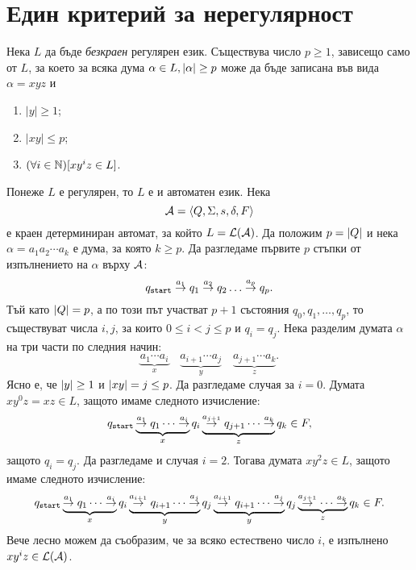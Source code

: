 \section{Един критерий за нерегулярност}

\begin{lemma}
  \label{lem:regular:pumping}
  Нека $L$ да бъде {\em безкраен} регулярен език.
  Съществува число $p\geq 1$, зависещо само от $L$, 
  за което за всяка дума $\alpha\in L, \lvert{\alpha}\rvert\geq p$ може да 
  бъде записана във вида $\alpha = xyz$ и 
  \begin{enumerate}[1)]
  \item
    $|y|\geq 1$;
  \item
    $|xy|\leq p$;
  \item
    $(\forall i\in\mathbb{N})[xy^iz \in L]$.
  \end{enumerate}
\end{lemma}
\begin{hint}
  Понеже $L$ е регулярен, то $L$ е и автоматен език. Нека
  \[\mathcal{A} = \langle{Q,\Sigma,s,\delta,F}\rangle\]
  е краен детерминиран автомат, за който $L = \mathcal{L}(\mathcal{A})$.
  Да положим $p = \lvert{Q}\rvert$ и нека $\alpha = a_1a_2\cdots a_k$ е дума, за която $k \geq p$.
  Да разгледаме първите $p$ стъпки от изпълнението на $\alpha$ върху $\mathcal{A}$:
  \[q_{\texttt{start}}\stackrel{a_1}{\rightarrow} q_1 \stackrel{a_2}{\rightarrow}q_2 \dots \stackrel{a_p}{\rightarrow} q_p.\]
  Тъй като $\lvert{Q}\rvert = p$, а по този път участват $p+1$ състояния $q_0,q_1,\dots,q_p$,
  то съществуват числа $i, j$, за които $0\leq i < j\leq p$ и $q_i = q_j$.
  Нека разделим думата $\alpha$ на три части по следния начин:
  \[\underbrace{a_1\cdots a_i}_{x}\quad \underbrace{a_{i+1}\cdots a_j}_{y}\quad \underbrace{a_{j+1}\cdots a_k}_{z}.\]
  Ясно е, че $\lvert{y}\rvert \geq 1$ и $\lvert{xy}\rvert = j \leq p$.
  Да разгледаме случая за $i = 0$.
  Думата $xy^0z = xz \in L$, защото имаме следното изчисление:
  \[q_{\texttt{start}}\underbrace{\stackrel{a_1}{\rightarrow}q_1 \cdots \stackrel{a_i}{\rightarrow}}_{x} q_i\underbrace{\stackrel{a_{j+1}}{\rightarrow}q_{j+1}\cdots\stackrel{a_{k}}{\rightarrow}}_{z}q_k\in F,\]
  защото $q_i = q_j$.
  Да разгледаме и случая $i = 2$. Тогава думата $xy^2z \in L$, защото имаме следното изчисление:
  \[q_{\texttt{start}}\underbrace{\stackrel{a_1}{\rightarrow}q_1 \cdots \stackrel{a_i}{\rightarrow}}_{x} q_i\underbrace{\stackrel{a_{i+1}}{\rightarrow}q_{i+1}\cdots\stackrel{a_{j}}{\rightarrow}}_{y}q_j\underbrace{\stackrel{a_{i+1}}{\rightarrow}q_{i+1}\cdots\stackrel{a_{j}}{\rightarrow}}_{y}q_j\underbrace{\stackrel{a_{j+1}}{\rightarrow}\cdots\stackrel{a_{k}}{\rightarrow}}_{z}q_k\in F.\]
  Вече лесно можем да съобразим, че за всяко естествено число $i$, е изпълнено $xy^iz \in \mathcal{L}(\mathcal{A})$.
\end{hint}

